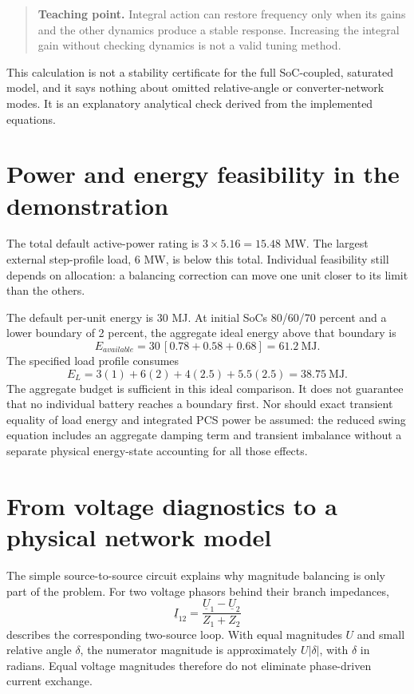 \documentclass[11pt,a4paper]{article}
\newcommand{\lesson}[1]{\begin{quote}\textbf{Teaching point.} #1\end{quote}}
\begin{document}
\lesson{Integral action can restore frequency only when its gains and the other dynamics produce a stable response. Increasing the integral gain without checking dynamics is not a valid tuning method.}
This calculation is not a stability certificate for the full SoC-coupled, saturated model, and it says nothing about omitted relative-angle or converter-network modes. It is an explanatory analytical check derived from the implemented equations.

\section{Power and energy feasibility in the demonstration}
The total default active-power rating is $3\times5.16=15.48$ MW. The largest external step-profile load, 6 MW, is below this total. Individual feasibility still depends on allocation: a balancing correction can move one unit closer to its limit than the others.

The default per-unit energy is 30 MJ. At initial SoCs 80/60/70 percent and a lower boundary of 2 percent, the aggregate ideal energy above that boundary is
\begin{equation}
E_{available}=30\,[0.78+0.58+0.68]=61.2\ \mathrm{MJ}.
\end{equation}
The specified load profile consumes
\begin{equation}
E_L=3(1)+6(2)+4(2.5)+5.5(2.5)=38.75\ \mathrm{MJ}.
\end{equation}
The aggregate budget is sufficient in this ideal comparison. It does not guarantee that no individual battery reaches a boundary first. Nor should exact transient equality of load energy and integrated PCS power be assumed: the reduced swing equation includes an aggregate damping term and transient imbalance without a separate physical energy-state accounting for all those effects.

\section{From voltage diagnostics to a physical network model}
The simple source-to-source circuit explains why magnitude balancing is only part of the problem. For two voltage phasors behind their branch impedances,
\begin{equation}
\underline I_{12}=\frac{\underline U_1-\underline U_2}{Z_1+Z_2}
\end{equation}
describes the corresponding two-source loop. With equal magnitudes $U$ and small relative angle $\delta$, the numerator magnitude is approximately $U|\delta|$, with $\delta$ in radians. Equal voltage magnitudes therefore do not eliminate phase-driven current exchange.
\end{document}
